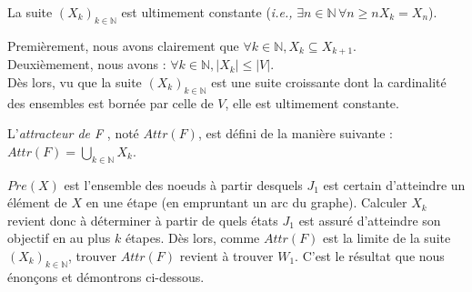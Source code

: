 	
	\begin{propriete}
		\label{prop:suiteUltConst}$ $\\
		La suite $(X_{k})_{k \in \mathbb{N}}$ est ultimement constante (\emph{i.e.,} $\exists n \in \mathbb{N} \, \forall n \geq n X_k = X_n$). 
	\end{propriete}
	\begin{demonstration}
		
		Premièrement, nous avons clairement que  $\forall k \in \mathbb{N}, X_{k} \subseteq X_{k+1}$.\\
		Deuxièmement, nous avons : $\forall k \in \mathbb{N}, |X_{k}| \leq |V| $.\\
		Dès lors, vu que la suite $(X_{k})_{k \in \mathbb{N}}$ est une suite croissante dont la cardinalité des ensembles est bornée par celle de $V$, elle est ultimement constante.\\
		
	\end{demonstration}
	
	
	
	\begin{defi}
	 L'\textit{attracteur de F} , noté $Attr(F)$, est défini de la manière suivante :$Attr(F) = \bigcup_{k \in \mathbb{N}} X_k$.
	\end{defi}
	
	
	$Pre(X)$ est l'ensemble des noeuds à partir desquels $J_1$ est certain d'atteindre un élément de $X$ en une étape (en empruntant un arc du graphe). Calculer $X_k$ revient donc à déterminer à partir de quels états $J_1$ est assuré d'atteindre son objectif en au plus $k$ étapes. Dès lors, comme $Attr(F)$ est la limite de la suite $(X_k)_{k \in \mathbb{N}}$, trouver $Attr(F)$ revient à trouver $W_1$. C'est le résultat que nous énonçons et démontrons ci-dessous.
	

